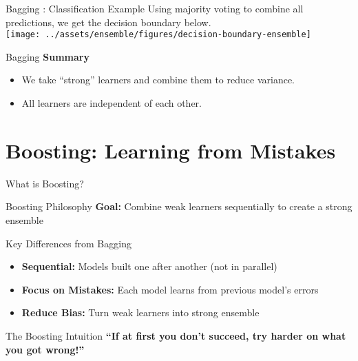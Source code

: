 \documentclass[10pt]{beamer}
\newcommand{\fitpic}[1]{\begin{adjustbox}{max width=\linewidth, max totalheight=0.78\textheight}#1\end{adjustbox}}
\begin{document}
\begin{frame}{Bagging : Classification Example}
  Using majority voting to combine all predictions, we get the decision boundary below.\\
  \vspace{0.5cm}
  \centering
  \fitpic{\texttt{[image: ../assets/ensemble/figures/decision-boundary-ensemble]}}
\end{frame}

\begin{frame}{Bagging}
  \textbf{Summary}
  \begin{itemize}
    \item We take ``strong'' learners and combine them to reduce variance.
    \item All learners are independent of each other.
  \end{itemize}
\end{frame}

\section{Boosting: Learning from Mistakes}

\begin{frame}{What is Boosting?}
\begin{definitionbox}{Boosting Philosophy}
\textbf{Goal:} Combine weak learners sequentially to create a strong ensemble
\end{definitionbox}

\begin{keypointsbox}{Key Differences from Bagging}
\begin{itemize}
\item \textbf{Sequential:} Models built one after another (not in parallel)
\item \textbf{Focus on Mistakes:} Each model learns from previous model's errors
\item \textbf{Reduce Bias:} Turn weak learners into strong ensemble
\end{itemize}
\end{keypointsbox}

\begin{examplebox}{The Boosting Intuition}
\textbf{\small{``If at first you don't succeed, try harder on what you got wrong!''}}
\end{examplebox}
\end{frame}
\end{document}
